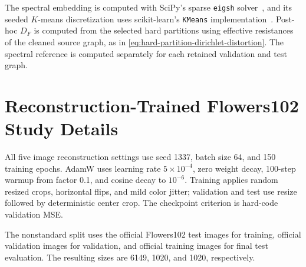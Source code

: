 The spectral embedding is computed with SciPy's sparse \texttt{eigsh} solver~\citep{virtanen2020scipy}, and its seeded $K$-means discretization uses scikit-learn's \texttt{KMeans} implementation~\citep{pedregosa2011scikit}.
Post-hoc $D_F$ is computed from the selected hard partitions using effective resistances of the cleaned source graph, as in \cref{eq:hard-partition-dirichlet-distortion}.
The spectral reference is computed separately for each retained validation and test graph.

\section{Reconstruction-Trained Flowers102 Study Details}
\label{app:flowers102-details}

All five image reconstruction settings use seed 1337, batch size 64, and 150 training epochs.
AdamW uses learning rate $5\times10^{-4}$, zero weight decay, 100-step warmup from factor 0.1, and cosine decay to $10^{-6}$.
Training applies random resized crops, horizontal flips, and mild color jitter; validation and test use resize followed by deterministic center crop.
The checkpoint criterion is hard-code validation MSE.

The nonstandard split uses the official Flowers102 test images for training, official validation images for validation, and official training images for final test evaluation.
The resulting sizes are 6149, 1020, and 1020, respectively.

